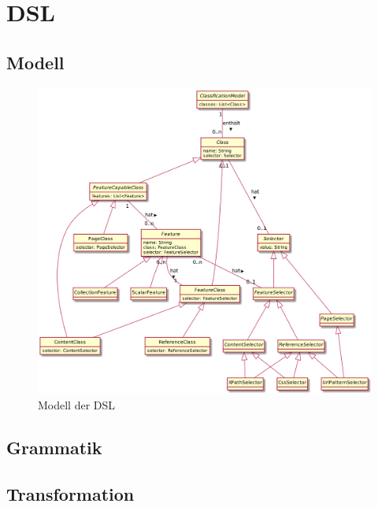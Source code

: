 \chapter{DSL}
    \section{Modell}
        \begin{figure}[htb]
            \centering
            \includegraphics[width=\textwidth]{../resources/dsl/model.png}
            \caption{Modell der DSL}
            \label{image:dslCompleteModel}
        \end{figure}
    
    \section{Grammatik}
        

    \section{Transformation}
    